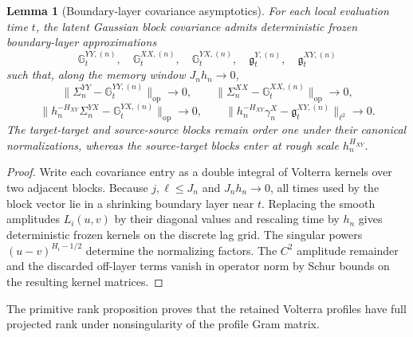 \documentclass[11pt,a4paper]{amsart}
\theoremstyle{plain}
\newtheorem{lemma}[theorem]{Lemma}
\theoremstyle{definition}
\theoremstyle{remark}
\begin{document}
\begin{lemma}[Boundary-layer covariance asymptotics]\label{lem:boundary-covariance}
For each local evaluation time \(t\), the latent Gaussian block covariance admits deterministic
frozen boundary-layer approximations
\[
        \mathbb G_t^{YY,(n)},\quad
        \mathbb G_t^{XX,(n)},\quad
        \mathbb G_t^{YX,(n)},\quad
        \mathfrak g_t^{Y,(n)},\quad
        \mathfrak g_t^{XY,(n)}
\]
such that, along the memory window \(J_nh_n\to0\),
\[
        \|\Sigma_n^{YY}-\mathbb G_t^{YY,(n)}\|_{\mathrm{op}}\to0,
        \qquad
        \|\Sigma_n^{XX}-\mathbb G_t^{XX,(n)}\|_{\mathrm{op}}\to0,
\]
\[
        \|h_n^{-H_{XY}}\Sigma_n^{YX}-\mathbb G_t^{YX,(n)}\|_{\mathrm{op}}\to0,
        \qquad
        \|h_n^{-H_{XY}}\gamma_n^X-\mathfrak g_t^{XY,(n)}\|_{\ell^2}\to0.
\]
The target-target and source-source blocks remain order one under their canonical normalizations,
whereas the source-target blocks enter at rough scale \(h_n^{H_{XY}}\).
\end{lemma}

\begin{proof}
Write each covariance entry as a double integral of Volterra kernels over two adjacent blocks.
Because \(j,\ell\le J_n\) and \(J_nh_n\to0\), all times used by the block vector lie in a shrinking
boundary layer near \(t\).  Replacing the smooth amplitudes \(L_i(u,v)\) by their diagonal values and rescaling
time by \(h_n\) gives deterministic frozen kernels on the discrete lag grid.  The singular powers
\((u-v)^{H_i-1/2}\) determine the normalizing factors.  The \(C^2\) amplitude remainder and the
discarded off-layer terms vanish in operator norm by Schur bounds on the resulting kernel matrices.
\end{proof}

The primitive rank proposition proves that the retained Volterra profiles have full projected rank
under nonsingularity of the profile Gram matrix.
\end{document}
